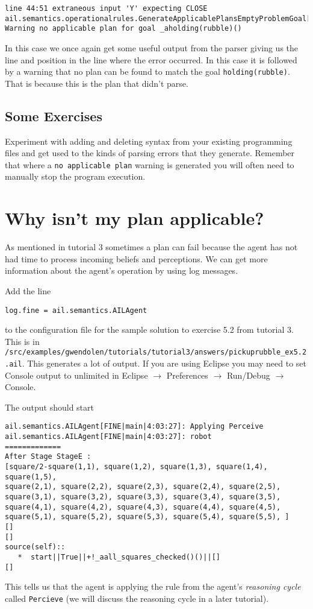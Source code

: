 \begin{verbatim}
line 44:51 extraneous input 'Y' expecting CLOSE
ail.semantics.operationalrules.GenerateApplicablePlansEmptyProblemGoal[WARNING|main|3:19:44]: 
Warning no applicable plan for goal _aholding(rubble)() 
\end{verbatim}

In this case we once again get some useful output from the parser giving us the line and position in the line where the error occurred.  In this case it is followed by a warning that no plan can be found to match the goal \texttt{holding(rubble)}.  That is because this is the plan that didn't parse.

\subsection{Some Exercises}
Experiment with adding and deleting syntax from your existing programming files and get used to the kinds of parsing errors that they generate.  Remember that where a \texttt{no applicable plan} warning is generated you will often need to manually stop the program execution.

\section{Why isn't my plan applicable?}

As mentioned in tutorial 3 sometimes a plan can fail because the agent has not had time to process incoming beliefs and perceptions.  We can get more information about the agent's operation by using log messages.

Add the line
\begin{verbatim}
log.fine = ail.semantics.AILAgent
\end{verbatim}
to the configuration file for the sample solution to exercise 5.2 from tutorial 3.  This is in \texttt{/src/examples/gwendolen/tutorials/tutorial3/answers/pickuprubble\_ex5.2.ail}.  This generates a lot of output.  If you are using Eclipse you may need to set Console output to unlimited in Eclipse $\rightarrow$ Preferences $\rightarrow$ Run/Debug $\rightarrow$ Console.

The output should start
\begin{verbatim}
ail.semantics.AILAgent[FINE|main|4:03:27]: Applying Perceive 
ail.semantics.AILAgent[FINE|main|4:03:27]: robot
=============
After Stage StageE :
[square/2-square(1,1), square(1,2), square(1,3), square(1,4), square(1,5), 
square(2,1), square(2,2), square(2,3), square(2,4), square(2,5), 
square(3,1), square(3,2), square(3,3), square(3,4), square(3,5), 
square(4,1), square(4,2), square(4,3), square(4,4), square(4,5), 
square(5,1), square(5,2), square(5,3), square(5,4), square(5,5), ]
[]
[]
source(self):: 
   *  start||True||+!_aall_squares_checked()()||[]
[] 
\end{verbatim}
This tells us that the agent is applying the rule from the agent's \emph{reasoning cycle} called \texttt{Percieve} (we will discuss the reasoning cycle in a later tutorial).

